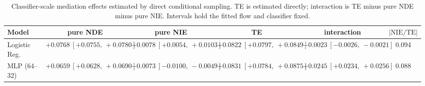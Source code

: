 \begin{table}[htbp]
  \centering
  \caption{Classifier-scale mediation effects estimated by direct conditional sampling. TE is estimated directly; interaction is TE minus pure NDE minus pure NIE. Intervals hold the fitted flow and classifier fixed.}
  \label{tab:acs_gap_overall}
  \begin{tabular}{lccccc}
    \toprule
    Model & pure NDE & pure NIE & TE & interaction & $|\mathrm{NIE}/\mathrm{TE}|$ \\
    \midrule
    Logistic Reg. & $+0.0768\ [+0.0755,\ +0.0780]$ & $+0.0078\ [+0.0054,\ +0.0103]$ & $+0.0822\ [+0.0797,\ +0.0849]$ & $-0.0023\ [-0.0026,\ -0.0021]$ & 0.094 \\
    MLP (64--32) & $+0.0659\ [+0.0628,\ +0.0690]$ & $-0.0073\ [-0.0100,\ -0.0049]$ & $+0.0831\ [+0.0784,\ +0.0875]$ & $+0.0245\ [+0.0234,\ +0.0256]$ & 0.088 \\
    \bottomrule
  \end{tabular}
\end{table}